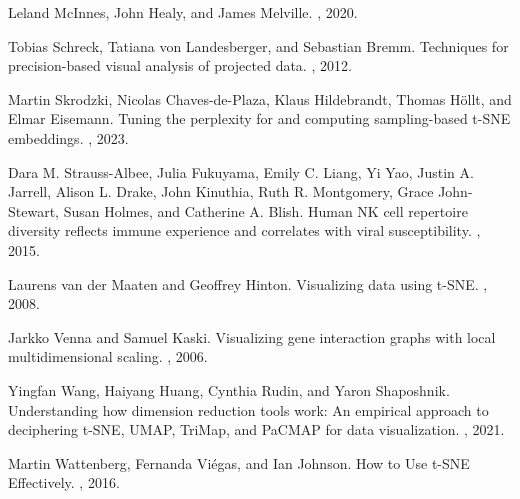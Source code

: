 \documentclass[webpdf,modern,large,namedate]{oup-authoring-template}
\theoremstyle{thmstyleone}%
\theoremstyle{thmstyletwo}%
\theoremstyle{thmstylethree}%
\begin{document}
\begin{thebibliography}{10}
\newblock Leland McInnes, John Healy, and James Melville.
, 2020.

Tobias Schreck, Tatiana von Landesberger, and Sebastian Bremm.
\newblock Techniques for precision-based visual analysis of projected data.
, 2012.

Martin Skrodzki, Nicolas Chaves-de-Plaza, Klaus Hildebrandt, Thomas H\"ollt, and Elmar Eisemann.
\newblock Tuning the perplexity for and computing sampling-based t-SNE embeddings.
, 2023.

Dara M. Strauss-Albee, Julia Fukuyama, Emily C. Liang, Yi Yao, Justin A. Jarrell, Alison L. Drake, John Kinuthia, Ruth R. Montgomery, Grace John-Stewart, Susan Holmes, and Catherine A. Blish.
\newblock Human NK cell repertoire diversity reflects immune experience and correlates with viral susceptibility.
, 2015.
 
Laurens van der Maaten and Geoffrey Hinton.
\newblock Visualizing data using t-SNE.
, 2008.

Jarkko Venna and Samuel Kaski.
\newblock Visualizing gene interaction graphs with local multidimensional scaling.
, 2006.

Yingfan Wang, Haiyang Huang, Cynthia Rudin, and Yaron Shaposhnik.
\newblock Understanding how dimension reduction tools work: An empirical approach to deciphering t-SNE, UMAP, TriMap, and PaCMAP for data visualization.
, 2021.

Martin Wattenberg, Fernanda Vi\'egas, and Ian Johnson.
\newblock How to Use t-SNE Effectively.
, 2016.

\end{thebibliography}
\end{document}
